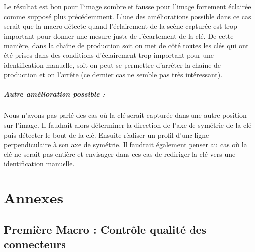 \documentclass{scrreprt}
\begin{document}
Le résultat est bon pour l'image sombre et fausse pour l'image fortement éclairée comme supposé plus précédemment.
L'une des améliorations possible dans ce cas serait que la macro détecte quand l'éclairement de la scène capturée 
est trop important pour donner une mesure juste de l'écartement de la clé. De cette manière, dans la chaîne de production
soit on met de côté toutes les clés qui ont été prises dans des conditions d'éclairement trop important pour une identification
manuelle, soit on peut se permettre d'arrêter la chaîne de production et on l'arrête (ce dernier cas ne semble pas très intéressant).

\newpage
\paragraph{Autre amélioration possible : }
Nous n'avons pas parlé des cas où la clé serait capturée dans une autre position sur l'image. Il faudrait alors
déterminer la direction de l'axe de symétrie de la clé puis détecter le bout de la clé. Ensuite réaliser un profil d'une ligne 
perpendiculaire à son axe de symétrie. Il faudrait également penser au cas où la clé ne serait pas entière et envisager dans 
ces cas de rediriger la clé vers une identification manuelle.  

\chapter{Annexes}

\section{Première Macro : Contrôle qualité des connecteurs}
\end{document}

